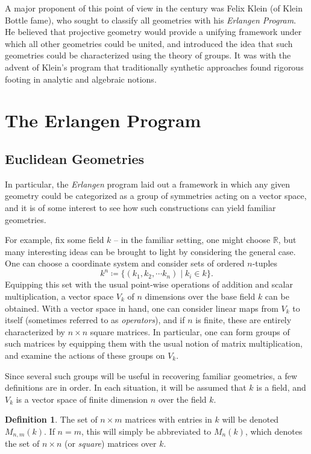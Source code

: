 \documentclass{article}
\theoremstyle{definition}
\newtheorem{definition}[theorem]{Definition} %
\newcommand{\RR}{\mathbb{R}}
\newcommand{\definedas}[0]{\coloneqq}
\newcommand{\theset}[1]{\{ #1 \}}
\begin{document}
A major proponent of this point of view in the  century was Felix
Klein (of Klein Bottle fame), who sought to classify all geometries with
his \emph{Erlangen Program}. He believed that projective geometry would
provide a unifying framework under which all other geometries could be
united, and introduced the idea that such geometries could be
characterized using the theory of groups. It was with the advent of
Klein's program that traditionally synthetic approaches found rigorous
footing in analytic and algebraic notions.

\section{The Erlangen Program}\label{header-n51}
\subsection{Euclidean Geometries}

In particular, the \textit{Erlangen} program laid out a framework in which any given
geometry could be categorized as a group of symmetries acting on a
vector space, and it is of some interest to see how such constructions can yield familiar geometries.

For example, fix some field \(k\) -- in the familiar setting, one might
choose \(\RR\), but many interesting ideas can be brought to light by considering the
general case. One can choose a coordinate system and consider sets of
ordered \(n\)-tuples
\[k^n \definedas \theset{(k_1, k_2, \cdots k_n) \mid k_i \in k}.\]
Equipping this set with the usual point-wise operations of addition and scalar
multiplication, a vector space \(V_k\) of \(n\)
dimensions over the base field \(k\) can be obtained. With a vector space in hand, one
can consider linear maps from \(V_k\) to itself (sometimes referred to as \textit{operators}), and if \(n\) is finite,
these are entirely characterized by \(n\times n\) square matrices. In
particular, one can form groups of such matrices by equipping them with the usual notion of matrix multiplication, and examine the
actions of these groups on \(V_k\).

Since several such groups will be useful in recovering
familiar geometries, a few definitions are in order. In each situation,
it will be assumed that \(k\) is a field, and \(V_k\) is a vector space
of finite dimension \(n\) over the field \(k\).

\begin{definition} The set of \(n\times m\) matrices with entries in \(k\) will
be denoted \(M_{n,m}(k)\). If \(n=m\), this will simply be abbreviated
to \(M_n(k)\), which denotes the set of \(n\times n\) (or \textit{square}) matrices over
\(k\).
\end{definition}
\end{document}
